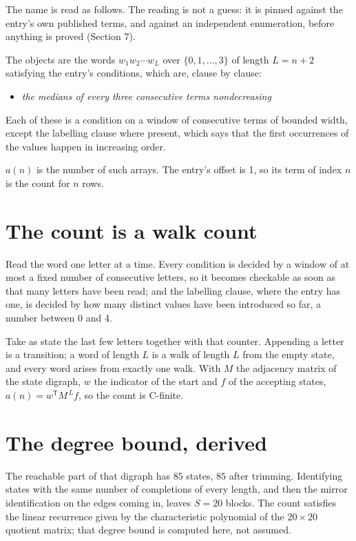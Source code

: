 \documentclass[11pt]{article}
\theoremstyle{definition}
\begin{document}
The name is read as follows. The reading is not a guess: it is pinned against the entry's own published terms, and against an independent enumeration, before anything is proved (Section 7).

The objects are the words $w_1 w_2 \cdots w_L$ over $\{0,1,\dots,3\}$ of length $L = n + 2$ satisfying the entry's conditions, which are, clause by clause:

\begin{itemize}

\item {\itshape the medians of every three consecutive terms nondecreasing}

\end{itemize}

Each of these is a condition on a window of consecutive terms of bounded width, except the labelling clause where present, which says that the first occurrences of the values happen in increasing order.

$a(n)$ is the number of such arrays. The entry's offset is 1, so its term of index $n$ is the count for $n$ rows.

\section{The count is a walk count}

Read the word one letter at a time. Every condition is decided by a window of at most a fixed number of consecutive letters, so it becomes checkable as soon as that many letters have been read; and the labelling clause, where the entry has one, is decided by how many distinct values have been introduced so far, a number between $0$ and 4.

Take as state the last few letters together with that counter. Appending a letter is a transition; a word of length $L$ is a walk of length $L$ from the empty state, and every word arises from exactly one walk. With $M$ the adjacency matrix of the state digraph, $w$ the indicator of the start and $f$ of the accepting states, $a(n) = w^{\mathsf T}M^{\,L}f$, so the count is C-finite.

\section{The degree bound, derived}

The reachable part of that digraph has $85$ states, $85$ after trimming. Identifying states with the same number of completions of every length, and then the mirror identification on the edges coming in, leaves $S = 20$ blocks. The count satisfies the linear recurrence given by the characteristic polynomial of the $20\times20$ quotient matrix; that degree bound is computed here, not assumed.
\end{document}

